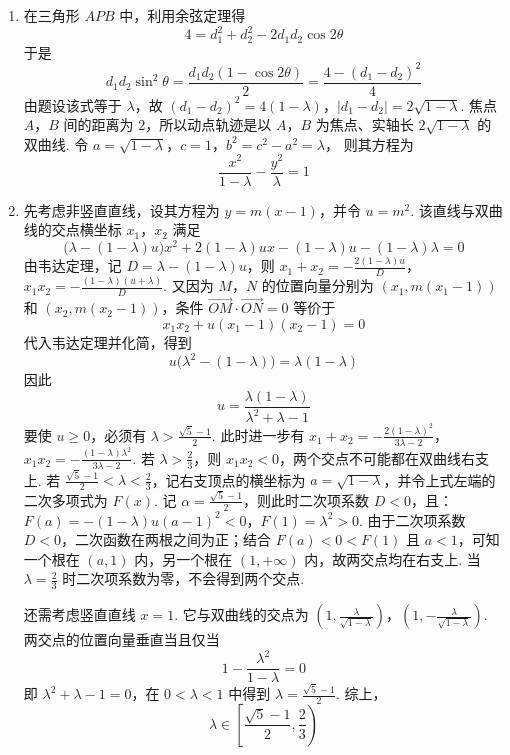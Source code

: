 \begin{solution}
\begin{enumerate}
\item 在三角形 \(APB\) 中，利用余弦定理得
\[
4=d_1^2+d_2^2-2d_1d_2\cos2\theta
\]
于是
\[
d_1d_2\sin^2\theta
=\frac{d_1d_2(1-\cos2\theta)}{2}
=\frac{4-(d_1-d_2)^2}{4}
\]
由题设该式等于 \(\lambda\)，故
\((d_1-d_2)^2=4(1-\lambda)\)，\(|d_1-d_2|=2\sqrt{1-\lambda}\).
焦点 \(A\)，\(B\) 间的距离为 \(2\)，所以动点轨迹是以 \(A\)，\(B\) 为焦点、实轴长 \(2\sqrt{1-\lambda}\) 的双曲线. 令
\(a=\sqrt{1-\lambda}\)，\(c=1\)，\(b^2=c^2-a^2=\lambda\)，
则其方程为
\[
\frac{x^2}{1-\lambda}-\frac{y^2}{\lambda}=1
\]

\item 先考虑非竖直直线，设其方程为 \(y=m(x-1)\)，并令 \(u=m^2\). 该直线与双曲线的交点横坐标 \(x_1\)，\(x_2\) 满足
\[
\bigl(\lambda-(1-\lambda)u\bigr)x^2+2(1-\lambda)ux-(1-\lambda)u-(1-\lambda)\lambda=0
\]
由韦达定理，记 \(D=\lambda-(1-\lambda)u\)，则
\(x_1+x_2=-\frac{2(1-\lambda)u}{D}\)，\(x_1x_2=-\frac{(1-\lambda)(u+\lambda)}{D}\).
又因为 \(M\)，\(N\) 的位置向量分别为 \((x_1,m(x_1-1))\) 和 \((x_2,m(x_2-1))\)，条件 \(\overrightarrow{OM}\cdot\overrightarrow{ON}=0\) 等价于
\[
x_1x_2+u(x_1-1)(x_2-1)=0
\]
代入韦达定理并化简，得到
\[
u\bigl(\lambda^2-(1-\lambda)\bigr)=\lambda(1-\lambda)
\]
因此
\[
u=\frac{\lambda(1-\lambda)}{\lambda^2+\lambda-1}
\]
要使 \(u\geqslant0\)，必须有 \(\lambda>\frac{\sqrt5-1}{2}\). 此时进一步有
\(x_1+x_2=-\frac{2(1-\lambda)^2}{3\lambda-2}\)，\(x_1x_2=-\frac{(1-\lambda)\lambda^2}{3\lambda-2}\).
若 \(\lambda>\frac23\)，则 \(x_1x_2<0\)，两个交点不可能都在双曲线右支上. 若 \(\frac{\sqrt5-1}{2}<\lambda<\frac23\)，记右支顶点的横坐标为 \(a=\sqrt{1-\lambda}\)，并令上式左端的二次多项式为 \(F(x)\). 记 \(\alpha=\frac{\sqrt5-1}{2}\)，则此时二次项系数 \(D<0\)，且：
\(F(a)=-(1-\lambda)u(a-1)^2<0\)，\(F(1)=\lambda^2>0\).
由于二次项系数 \(D<0\)，二次函数在两根之间为正；结合 \(F(a)<0<F(1)\) 且 \(a<1\)，可知一个根在 \((a,1)\) 内，另一个根在 \((1,+\infty)\) 内，故两交点均在右支上. 当 \(\lambda=\frac23\) 时二次项系数为零，不会得到两个交点.

还需考虑竖直直线 \(x=1\). 它与双曲线的交点为
\(\left(1,\frac{\lambda}{\sqrt{1-\lambda}}\right)\)，\(\left(1,-\frac{\lambda}{\sqrt{1-\lambda}}\right)\).
两交点的位置向量垂直当且仅当
\[
1-\frac{\lambda^2}{1-\lambda}=0
\]
即 \(\lambda^2+\lambda-1=0\)，在 \(0<\lambda<1\) 中得到 \(\lambda=\frac{\sqrt5-1}{2}\). 综上，
\[
\lambda\in\left[\frac{\sqrt5-1}{2},\frac23\right)
\]
\end{enumerate}
\end{solution}

